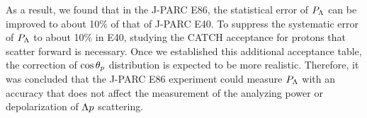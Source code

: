 As a result, we found that in the J-PARC E86, the statistical error of $P_{\Lambda}$ can be improved to about 10\% of that of J-PARC E40. To suppress the systematic error of $P_{\Lambda}$ to about 10\% in E40, studying the CATCH acceptance for protons that scatter forward is necessary. Once we established this additional acceptance table, the correction of $\cos{\theta_p}$ distribution is expected to be more realistic. Therefore, it was concluded that the J-PARC E86 experiment could measure $P_{\Lambda}$ with an accuracy that does not affect the measurement of the analyzing power or depolarization of $\Lambda p$ scattering.
 
%

